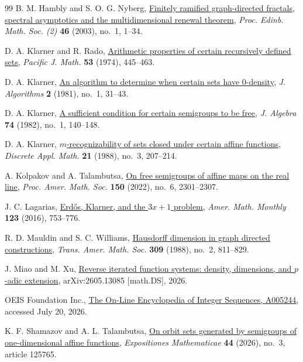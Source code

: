 \documentclass[11pt]{article}
\begin{document}
\begin{thebibliography}{99}
B. M. Hambly and S. O. G. Nyberg,
\href{https://doi.org/10.1017/S0013091500000730}
{Finitely ramified graph-directed fractals, spectral asymptotics and the
multidimensional renewal theorem},
\emph{Proc. Edinb. Math. Soc. (2)}
\textbf{46} (2003), no.~1, 1--34.

 D. A. Klarner and R. Rado, \href{https://projecteuclid.org/euclid.pjm/1102911612}{Arithmetic properties of certain recursively defined sets}, \emph{Pacific J. Math.} \textbf{53} (1974), 445--463.

D. A. Klarner,
\href{https://doi.org/10.1016/0196-6774(81)90005-5}
{An algorithm to determine when certain sets have 0-density},
\emph{J. Algorithms}
\textbf{2} (1981), no.~1, 31--43.

D. A. Klarner,
\href{https://doi.org/10.1016/0021-8693(82)90010-2}
{A sufficient condition for certain semigroups to be free},
\emph{J. Algebra}
\textbf{74} (1982), no.~1, 140--148.

D. A. Klarner,
\href{https://doi.org/10.1016/0166-218X(88)90067-4}
{$m$-recognizability of sets closed under certain affine functions},
\emph{Discrete Appl. Math.}
\textbf{21} (1988), no.~3, 207--214.

A. Kolpakov and A. Talambutsa,
\href{https://doi.org/10.1090/proc/15832}
{On free semigroups of affine maps on the real line},
\emph{Proc. Amer. Math. Soc.}
\textbf{150} (2022), no.~6, 2301--2307.

J. C. Lagarias,
\href{https://www.jstor.org/stable/10.4169/amer.math.monthly.123.8.753}
{Erd\H{o}s, Klarner, and the $3x+1$ problem},
\emph{Amer. Math. Monthly} \textbf{123} (2016), 753--776.

R. D. Mauldin and S. C. Williams,
\href{https://doi.org/10.1090/S0002-9947-1988-0961615-4}
{Hausdorff dimension in graph directed constructions},
\emph{Trans. Amer. Math. Soc.}
\textbf{309} (1988), no.~2, 811--829.

J. Miao and M. Xu,
\href{https://arxiv.org/abs/2605.13085}
{Reverse iterated function systems: density, dimensions, and $p$-adic
extension},
arXiv:2605.13085 [math.DS], 2026.

 OEIS Foundation Inc., \href{https://oeis.org/A005244}{The On-Line Encyclopedia of Integer Sequences, A005244}, accessed July 20, 2026.

K. F. Shamazov and A. L. Talambutsa,
\href{https://doi.org/10.1016/j.exmath.2026.125765}
{On orbit sets generated by semigroups of one-dimensional affine functions},
\emph{Expositiones Mathematicae}
\textbf{44} (2026), no.~3, article 125765.


\end{thebibliography}
\end{document}
